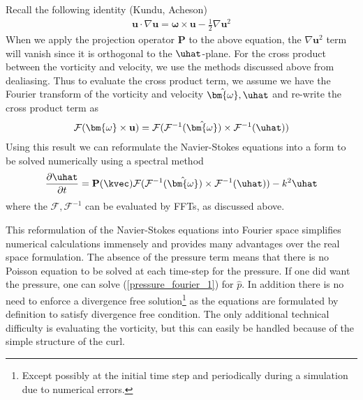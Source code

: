 Recall the following identity (Kundu, Acheson)
\begin{align}
\textbf{u}\cdot\nabla\textbf{u} = \bm{\omega}\times \textbf{u} - \frac{1}{2}\nabla \textbf{u}^{2}
\end{align}
When we apply the projection operator $\textbf{P}$ to the above equation, the $\nabla \textbf{u}^{2}$ term will vanish since it is orthogonal to the $\uhat$-plane. For the cross product between the vorticity and velocity, we use the methods discussed above from dealiasing. Thus to evaluate the cross product term, we assume we have the Fourier transform of the vorticity and velocity $\hat{\bm{\omega}},\uhat$ and re-write the cross product term as
\begin{align}
\mathcal{F}(\bm{\omega}\times \textbf{u}) = \mathcal{F}(\mathcal{F}^{-1}(\hat{\bm{\omega}})\times\mathcal{F}^{-1}(\uhat))
\end{align}
Using this result we can reformulate the Navier-Stokes equations into a form to be solved numerically using a spectral method
\begin{align}
\frac{\partial \uhat}{\partial t} = \textbf{P}(\kvec)\mathcal{F}(\mathcal{F}^{-1}(\hat{\bm{\omega}})\times\mathcal{F}^{-1}(\uhat))-k^{2}\uhat
\end{align}
where the $\mathcal{F},\mathcal{F}^{-1}$ can be evaluated by FFTs, as discussed above.

This reformulation of the Navier-Stokes equations into Fourier space simplifies numerical calculations immensely and provides many advantages over the real space formulation. The absence of the pressure term means that there is no Poisson equation to be solved at each time-step for the pressure. If one did want the pressure, one can solve (\ref{pressure_fourier_1}) for $\hat{p}$. In addition there is no need to enforce a divergence free solution\footnote{Except possibly at the initial time step and periodically during a simulation due to numerical errors.} as the equations are formulated by definition to satisfy divergence free condition. The only additional technical difficulty is evaluating the vorticity, but this can easily be handled because of the simple structure of the curl. 

